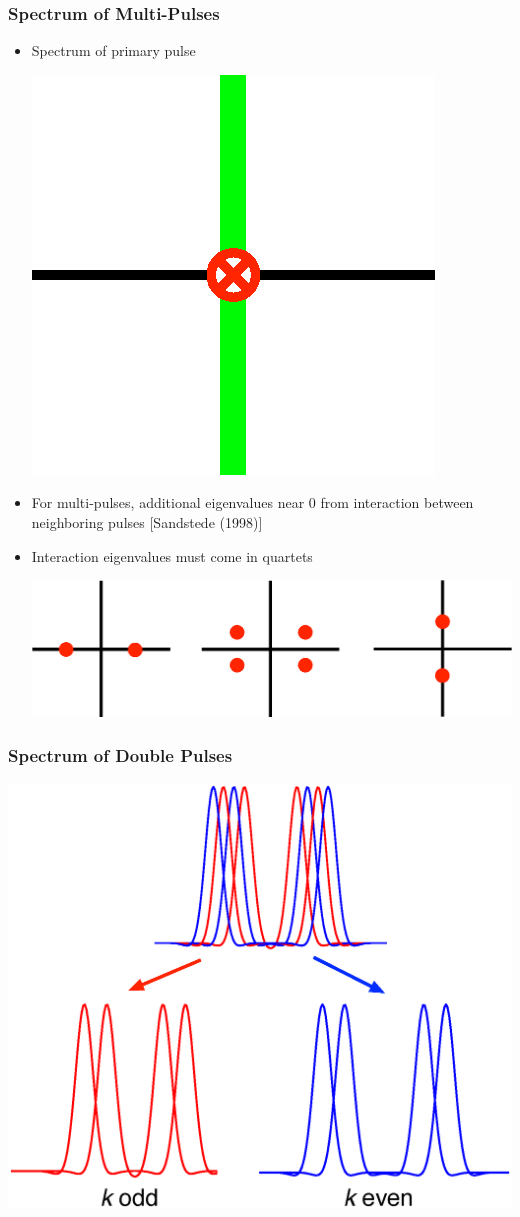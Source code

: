\documentclass[16pt]{beamer}
\begin{document}
\begin{frame}
	\frametitle{Spectrum of Multi-Pulses}
	\fontsize{16}{7.2}\selectfont
	\begin{itemize}
	\item Spectrum of primary pulse
		\begin{center}
			\includegraphics[width=0.2\linewidth]{images/eigsinglepulse.eps}
		\end{center}
	\item For multi-pulses, additional eigenvalues near 0 from interaction between neighboring pulses \footnotesize [Sandstede (1998)]
	\vspace{0.5cm}
	\fontsize{16}{7.2}\selectfont
	\item Interaction eigenvalues must come in quartets
		\begin{center}
			\includegraphics[width=0.8\linewidth]{images/eigdouble2}
		\end{center}
	\end{itemize}
\end{frame}

\begin{frame}
	\frametitle{Spectrum of Double Pulses}
	\begin{center}
		\includegraphics[width=0.8\linewidth]{images/dpsplit}
	\end{center}
\end{frame}
\end{document}
